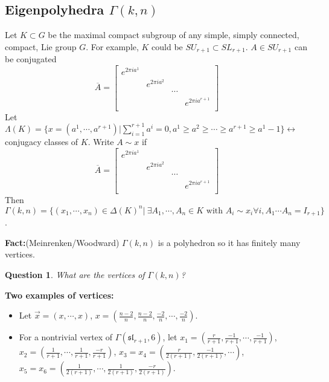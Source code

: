 \documentclass[12pt]{article}
\newtheorem{question}[theorem]{Question}
\begin{document}
\subsection{Eigenpolyhedra $ \Gamma(k,n)$}
Let $K \subset G$ be the maximal compact subgroup of any simple, simply connected, compact, Lie group $G$.  For example, $K$ could be $SU_{r+1} \subset SL_{r+1}$.  $A \in SU_{r+1}$ can be conjugated
\[ \overline{A} = \left[ \begin{array}{cccc}
e^{2\pi i a^1} &  & &  \\
  & e^{2\pi i a^2} & & \\
  &  & \cdots & \\
  & & & e^{2\pi i a^{r+1}} \\
\end{array} \right] \]
Let $\Lambda(K) = \{ x = (a^1,\cdots,a^{r+1}) | \sum_{i=1}^{r+1} a^i = 0, a^1 \geq a^2 \geq \cdots \geq a^{r+1} \geq a^1-1 \} \leftrightarrow$ conjugacy classes of $K$.  Write $A \sim x$ if 
\[ \overline{A} = \left[ \begin{array}{cccc}
e^{2\pi i a^1} &  & &  \\
  & e^{2\pi i a^2} & & \\
  &  & \cdots & \\
  & & & e^{2\pi i a^{r+1}} \\
\end{array} \right] \]
Then $\Gamma(k,n) = \{ (x_1,\cdots,x_n) \in \Delta(K)^n | \: \exists A_1, \cdots, A_n \in K \text{ with } A_i \sim x_i \forall i, A_1 \cdots A_n = I_{r+1} \}$.

\textbf{Fact:}(Meinrenken/Woodward) $\Gamma(k,n)$ is a polyhedron so it has finitely many vertices.

\begin{question}
What are the vertices of $\Gamma(k,n)$?
\end{question}

\textbf{Two examples of vertices:} 
\begin{itemize}
\item Let $\overrightarrow{x} = (x,\cdots,x)$, $x = (\frac{n-2}{n}, \frac{n-2}{n}, \frac{-2}{n}, \cdots, \frac{-2}{n}) $.
\item For a nontrivial vertex of $\Gamma(\mathfrak{sl}_{r+1},6)$, let $x_1 = (\frac{r}{r+1}, \frac{-1}{r+1},\cdots, \frac{-1}{r+1})$, $x_2 = (\frac{1}{r+1},\cdots,\frac{1}{r+1}, \frac{-r}{r+1})$, $x_3=x_4 = (\frac{r}{2(r+1)},\frac{-1}{2(r+1)}, \cdots)$, $x_5 = x_6 = (\frac{1}{2(r+1)},\cdots,\frac{1}{2(r+1)}, \frac{-r}{2(r+1)})$.
\end{itemize}
\end{document}
